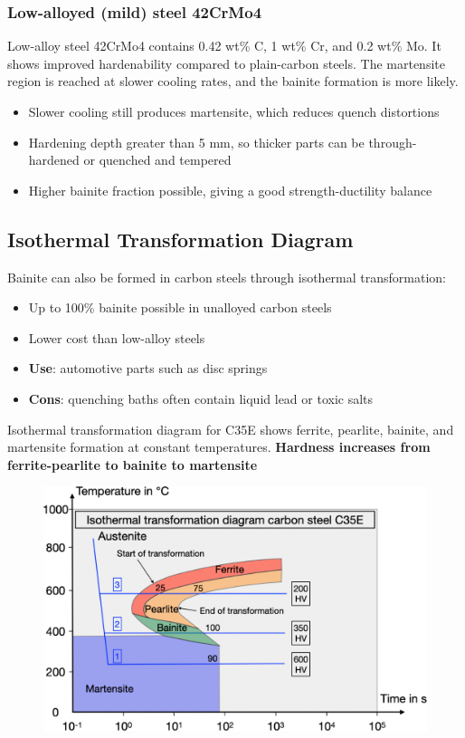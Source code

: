 \documentclass{article}
\begin{document}
\subsubsection{Low-alloyed (mild) steel 42CrMo4}
Low-alloy steel 42CrMo4 contains 0.42 wt\% C, 1 wt\% Cr, and 0.2 wt\% Mo. It shows
improved hardenability compared to plain-carbon steels. The martensite region is reached
at slower cooling rates, and the bainite formation is more likely.
\begin{itemize}
  \item Slower cooling still produces martensite, which reduces quench distortions
  \item Hardening depth greater than 5 mm, so thicker parts can be through-hardened or quenched and tempered
  \item Higher bainite fraction possible, giving a good strength-ductility balance
\end{itemize}

\subsection{Isothermal Transformation Diagram}
Bainite can also be formed in carbon steels through isothermal transformation:
\begin{itemize}
  \item Up to 100\% bainite possible in unalloyed carbon steels
  \item Lower cost than low-alloy steels
  \item \textbf{Use}: automotive parts such as disc springs
  \item \textbf{Cons}: quenching baths often contain liquid lead or toxic salts
\end{itemize}

Isothermal transformation diagram for C35E shows ferrite, pearlite, bainite, and martensite
formation at constant temperatures. \textbf{Hardness increases from ferrite-pearlite to bainite to martensite}

\newpage
\begin{figure}[ht!]
  \centering
  \includegraphics[width=.8\textwidth]{media/ITT_C35E.png}
\end{figure}
\end{document}
